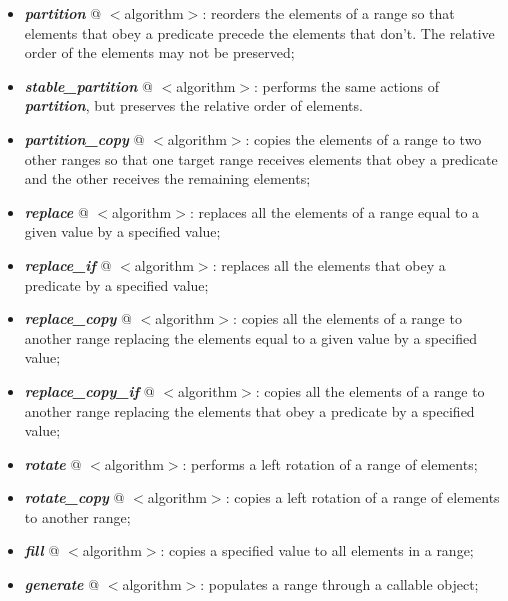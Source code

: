\documentclass[10pt]{article}
\begin{document}
\begin{multicols*}{5}
{{\begin{itemize}[leftmargin=*,topsep=0.25pt]
	\item  \emph{\textbf{partition}} @ $<$algorithm$>$: reorders the elements of a range so that elements that obey a predicate precede the elements that don't. The relative order of the elements may not be preserved;
	\item  \emph{\textbf{stable\_partition}} @ $<$algorithm$>$: performs the same actions of  \emph{\textbf{partition}}, but preserves the relative order of elements. 
	\item  \emph{\textbf{partition\_copy}} @ $<$algorithm$>$: copies the elements of a range to two other ranges so that one target range receives elements that obey a predicate and the other receives the remaining elements;
	\item  \emph{\textbf{replace}} @ $<$algorithm$>$: replaces all the elements of a range equal to a given value by a specified value;
	\item  \emph{\textbf{replace\_if}} @ $<$algorithm$>$: replaces all the elements that obey a predicate by a specified value;
	\item  \emph{\textbf{replace\_copy}} @ $<$algorithm$>$: copies all the elements of a range to another range replacing the elements equal to a given value by a specified value;
	\item  \emph{\textbf{replace\_copy\_if}} @ $<$algorithm$>$: copies all the elements of a range to another range replacing the elements that obey a predicate by a specified value;
	\item  \emph{\textbf{rotate}} @ $<$algorithm$>$: performs a left rotation of a range of elements;
	\item  \emph{\textbf{rotate\_copy}} @ $<$algorithm$>$: copies a left rotation of a range of elements to another range;
	\item  \emph{\textbf{fill}} @ $<$algorithm$>$: copies a specified value to all elements in a range;
	\item  \emph{\textbf{generate}} @ $<$algorithm$>$: populates a range through a callable object;


\end{itemize}

}}
\end{multicols*}
\end{document}
